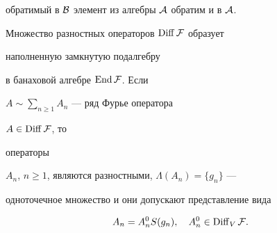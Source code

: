 обратимый в $\cal B$ элемент из алгебры $\cal A$ обратим и в $\cal A$. 


 


\begin{lem} Множество разностных операторов $\operatorname{Diff}\cal F$ образует 


наполненную замкнутую подалгебру 


в банаховой алгебре $\operatorname{End}\cal F$. Если 


$A\sim\sum\limits_{n\ge 1}A_n$ --- ряд Фурье оператора 


$A\in\operatorname{Diff}\cal F$, то 


операторы 


$A_n$, $n\ge 1$, являются разностными, $\Lambda(A_n)=\{g_n\}$ --- 


одноточечное множество и они допускают представление вида 


\begin{equation} 


A_n=A_n^0S(g_n),\quad A^0_n\in\Diff_V\cal F. 


\end{equation} 


\end{lem} 


 


